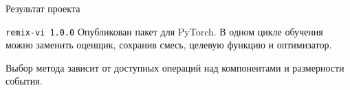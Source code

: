 \documentclass[aspectratio=169]{beamer}
\begin{document}
\begin{frame}{Результат проекта}
\begin{block}{\texttt{remix-vi 1.0.0}}
Опубликован пакет для PyTorch. В одном цикле обучения можно заменить оценщик, сохранив смесь, целевую функцию и оптимизатор.
\end{block}
Выбор метода зависит от доступных операций над компонентами и размерности события.
\medskip

\href{https://pypi.org/project/remix-vi/1.0.0/}{}
\end{frame}
\end{document}
